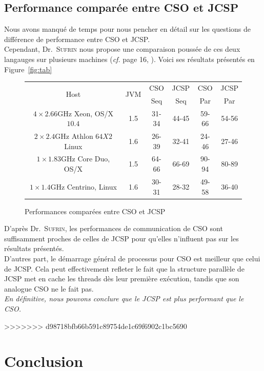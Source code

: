 \documentclass[a4paper,11pt,french]{report}
\begin{document}
\section{Performance comparée entre CSO et JCSP}
Nous avons manqué de temps pour nous pencher en détail sur les questions de différence de performance entre CSO et JCSP.\\
Cependant, Dr.\ \textsc{Sufrin} nous propose une comparaison poussée de ces deux langauges sur plusieurs machines (\emph{cf.} page 16, \cite{cpa2008-cso}). Voici ses résultats présentés en Figure~\vref{fig:tab}
\begin{figure}
\centering
\begin{tabular}{|cc||c|c|c|c|}
\hline \multirow{2}{1cm}{Host} & \multirow{2}{1cm}{JVM} & CSO & JCSP & CSO & JCSP \\ 
  &   & Seq & Seq & Par & Par \\ 
\hline\hline $4 \times 2.66$GHz Xeon, OS/X $10.4$ 
 & 1.5 & 31-34 & 44-45 & 59-66 & 54-56 \\ 
\hline $2 \times 2.4$GHz Athlon $64X2$ Linux 
 & 1.6 & 26-39 & 32-41 & 24-46 & 27-46 \\ 
\hline $1 \times 1.83$GHz Core Duo, OS/X 
 & 1.5 & 64-66 & 66-69 & 90-94 & 80-89 \\ 
\hline $1 \times 1.4$GHz Centrino, Linux 
 & 1.6 & 30-31 & 28-32 & 49-58 & 36-40 \\ 
\hline 
\end{tabular}
\caption{Performances comparées entre CSO et JCSP}
\label{fig:tab} 
\end{figure}

D'après Dr.\ \textsc{Sufrin}, les performances de communication de CSO sont suffisamment proches de celles de JCSP pour qu'elles n'influent pas sur les résultats présentés.\\

D'autres part, le démarrage général de processus pour CSO est meilleur que celui de JCSP. Cela peut effectivement refleter le fait que la structure parallèle de JCSP met en cache les threads dès leur première exécution, tandis que son analogue CSO ne le fait pas.\\

\emph{En définitive, nous pouvons conclure que le JCSP est plus performant que le CSO.}

>>>>>>> d98718bfb66b591c89754de1c69f6902c1bc5690
\chapter{Conclusion}
\end{document}
